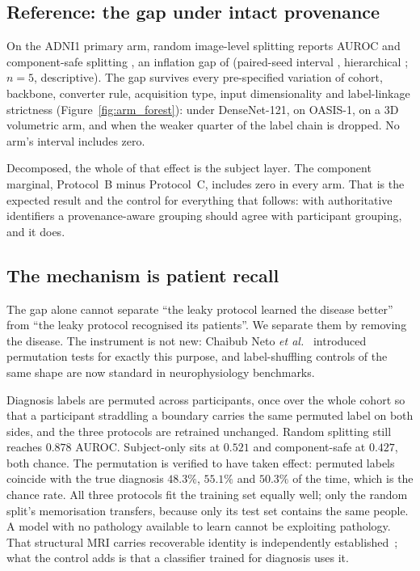 \documentclass[pdflatex,sn-vancouver-num]{sn-jnl}
\newcommand{\etal}{\textit{et al.}}
\begin{document}
\subsection{Reference: the gap under intact provenance}
\label{sec:reference}

On the ADNI1 primary arm, random image-level splitting reports
\AdniRandomAUROC{} AUROC and component-safe splitting \AdniSafeAUROC{}, an
inflation gap of \AdniGapTotal{} (paired-seed interval \AdniGapCI{},
hierarchical \AdniHierCI{}; $n=5$, descriptive). The gap survives every
pre-specified variation of cohort, backbone, converter rule, acquisition type,
input dimensionality and label-linkage strictness
(Figure~\ref{fig:arm_forest}): \AdniDenseGap{} under DenseNet-121,
\OasisGapTotal{} on OASIS-1, \VolGapTotal{} on a 3D volumetric arm, and
\AdniGapExactKey{} when the weaker quarter of the label chain is dropped. No
arm's interval includes zero.

Decomposed, the whole of that effect is the subject layer. The component
marginal, Protocol~B minus Protocol~C, includes zero in every arm. That is the
expected result and the control for everything that follows: with authoritative
identifiers a provenance-aware grouping should agree with participant grouping,
and it does.

\subsection{The mechanism is patient recall}
\label{sec:permutation}

The gap alone cannot separate ``the leaky protocol learned the disease better''
from ``the leaky protocol recognised its patients''. We separate them by
removing the disease. The instrument is not new: Chaibub Neto
\etal~\cite{chaibubneto2017permutation} introduced permutation tests for exactly
this purpose, and label-shuffling controls of the same shape are now standard in
neurophysiology benchmarks.

Diagnosis labels are permuted across participants, once over the whole cohort so
that a participant straddling a boundary carries the same permuted label on both
sides, and the three protocols are retrained unchanged. Random splitting still
reaches $0.878$ AUROC. Subject-only sits at $0.521$ and component-safe at
$0.427$, both chance. The permutation is verified to have taken effect: permuted
labels coincide with the true diagnosis $48.3\%$, $55.1\%$ and $50.3\%$ of the
time, which is the chance rate. All three protocols fit the training set equally
well; only the random split's memorisation transfers, because only its test set
contains the same people. A model with no pathology available to learn cannot be
exploiting pathology. That structural MRI carries recoverable identity is
independently established~\cite{deepbrainprint2023,wachinger2015brainprint,schwarz2019face};
what the control adds is that a classifier trained for diagnosis uses it.
\end{document}
